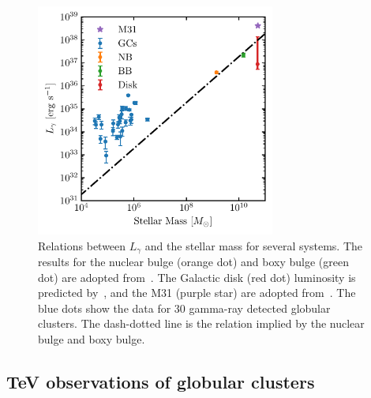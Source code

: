 \documentclass[doublespace,nopageskip]{VTthesis}
\begin{document}
\begin{figure}[htb]
    \centering
    \includegraphics[width=0.7\textwidth]{Figures/Globular/mass.pdf}
    \caption{Relations between $L_\gamma$ and the stellar mass for several systems. The results for the nuclear bulge (orange dot) and boxy bulge (green dot) are adopted from~\citet{2019JCAP...09..042M}. The Galactic disk (red dot) luminosity is predicted by~\citet{2018NatAs...2..819B}, and the M31 (purple star) are adopted from~\citet{2017ApJ...836..208A}. The blue dots show the data for 30 gamma-ray detected globular clusters. The dash-dotted line is the relation implied by the nuclear bulge and boxy bulge.}
    \label{fig:stellar_mass}
\end{figure}

\subsection{TeV observations of globular clusters}
\end{document}
